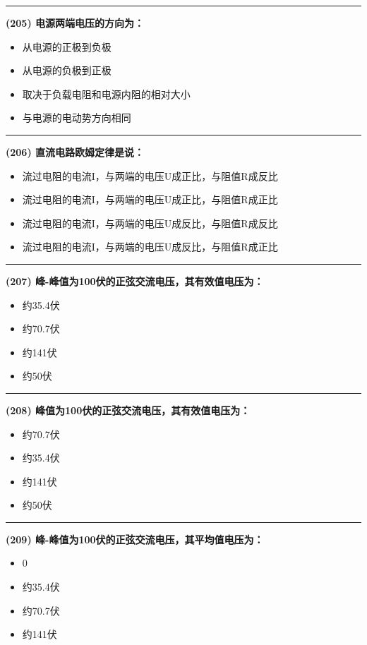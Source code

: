 \documentclass[twocolumn]{ctexart}  %
\begin{document}
\noindent\rule{0.5\textwidth}{1pt}
\heiti \textbf{(205) 电源两端电压的方向为：} \songti {\color{gray} [LK0438] }
\begin{itemize}
	\item  从电源的正极到负极
	\item  从电源的负极到正极
	\item  取决于负载电阻和电源内阻的相对大小
	\item  与电源的电动势方向相同
\end{itemize}


\noindent\rule{0.5\textwidth}{1pt}
\heiti \textbf{(206) 直流电路欧姆定律是说：} \songti {\color{gray} [LK0440] }
\begin{itemize}
	\item  流过电阻的电流I，与两端的电压U成正比，与阻值R成反比
	\item  流过电阻的电流I，与两端的电压U成正比，与阻值R成正比
	\item  流过电阻的电流I，与两端的电压U成反比，与阻值R成反比
	\item  流过电阻的电流I，与两端的电压U成反比，与阻值R成正比
\end{itemize}


\noindent\rule{0.5\textwidth}{1pt}
\heiti \textbf{(207) 峰-峰值为100伏的正弦交流电压，其有效值电压为：} \songti {\color{gray} [LK0512] }
\begin{itemize}
	\item  约35.4伏
	\item  约70.7伏
	\item  约141伏
	\item  约50伏
\end{itemize}


\noindent\rule{0.5\textwidth}{1pt}
\heiti \textbf{(208) 峰值为100伏的正弦交流电压，其有效值电压为：} \songti {\color{gray} [LK0513] }
\begin{itemize}
	\item  约70.7伏
	\item  约35.4伏
	\item  约141伏
	\item  约50伏
\end{itemize}


\noindent\rule{0.5\textwidth}{1pt}
\heiti \textbf{(209) 峰-峰值为100伏的正弦交流电压，其平均值电压为：} \songti {\color{gray} [LK0518] }
\begin{itemize}
	\item  0
	\item  约35.4伏
	\item  约70.7伏
	\item  约141伏
\end{itemize}
\end{document}
